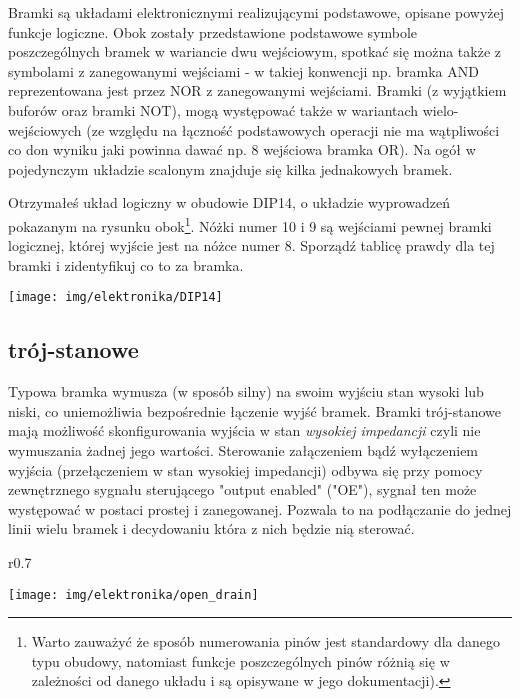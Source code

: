 \documentclass{pdfBooklets}
\begin{document}
Bramki są układami elektronicznymi realizującymi podstawowe, opisane powyżej funkcje logiczne. Obok zostały przedstawione podstawowe symbole poszczególnych bramek w wariancie dwu wejściowym, spotkać się można także z symbolami z zanegowanymi wejściami - w takiej konwencji np. bramka AND reprezentowana jest przez NOR z zanegowanymi wejściami. Bramki (z wyjątkiem buforów oraz bramki NOT), mogą występować także w wariantach wielo-wejściowych (ze względu na łączność podstawowych operacji nie ma wątpliwości co don wyniku jaki powinna dawać np. 8 wejściowa bramka OR). Na ogół w pojedynczym układzie scalonym znajduje się kilka jednakowych bramek.

\begin{Zadanie}{}{}
\noindent\begin{minipage}[t]{\textwidth}
	\noindent\parbox[b]{0.7\textwidth}{
		Otrzymałeś układ logiczny w obudowie DIP14, o układzie wyprowadzeń pokazanym na rysunku obok\footnote{
			Warto zauważyć że sposób numerowania pinów jest standardowy dla danego typu obudowy, natomiast funkcje poszczególnych pinów różnią się w zależności od danego układu i są opisywane w jego dokumentacji).
		}.
		Nóżki numer 10 i 9 są wejściami pewnej bramki logicznej, której wyjście jest na nóżce numer 8. Sporządź tablicę prawdy dla tej bramki i zidentyfikuj co to za bramka.
		\vspace{0.25cm}
	}\hfill\parbox[b]{0.25\textwidth}{
		\texttt{[image: img/elektronika/DIP14]}
		\vspace{-0.5cm}
	}
\end{minipage}
\end{Zadanie}

\subsection{trój-stanowe}
Typowa bramka wymusza (w sposób silny) na swoim wyjściu stan wysoki lub niski, co uniemożliwia bezpośrednie łączenie wyjść bramek.
Bramki trój-stanowe mają możliwość skonfigurowania wyjścia w stan \emph{wysokiej impedancji} czyli nie wymuszania żadnej jego wartości.
Sterowanie załączeniem bądź wyłączeniem wyjścia (przełączeniem w stan wysokiej impedancji) odbywa się przy pomocy zewnętrznego sygnału sterującego "output enabled" ("OE"), sygnał ten może występować w postaci prostej i zanegowanej.
Pozwala to na podłączanie do jednej linii wielu bramek i decydowaniu która z nich będzie nią sterować.

\begin{wrapfigure}{r}{0.7\textwidth}
  \begin{center}
    \vspace{-40pt}
    \texttt{[image: img/elektronika/open\_drain]}
    \vspace{-20pt}
  \end{center}
\end{wrapfigure}
\end{document}
